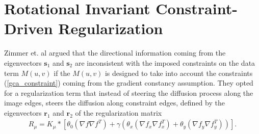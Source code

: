 \chapter{Rotational Invariant Constraint-Driven Regularization}
Zimmer et. al \cite{zimmer2011optic} argued that the directional information coming from the eigenvectors $\textbf{s}_1$ and $\textbf{s}_2$ are inconsistent with the imposed constraints on the data term $M(u,v)$ if the $M(u,v)$ is designed to take into account the constraints (\ref{gca_constraint}) coming from the gradient constancy assumption. They opted for a regularization term that instead of steering the diffusion process along the image edges, steers the diffusion along constraint edges, defined by the eigenvectors $\textbf{r}_1$ and $\textbf{r}_2$ of the regularization matrix
\begin{align}
R_{\mu} = K_{\mu} * \left[ \theta_0(\nabla f \nabla f^T) + \gamma \left( \theta_x(\nabla f_x \nabla f_x^T) + \theta_y(\nabla f_y \nabla f_y^T) \right) \right].
\end{align}
